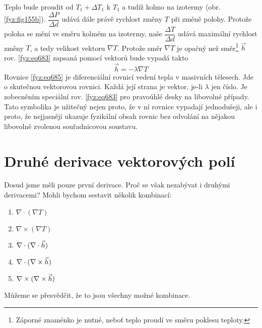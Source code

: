     Teplo bude proudit od $T_1+\Delta T_1$ k $T_1$ a tudíž kolmo na izotermy (obr.
    \ref{fyz:fig155b}). $\dfrac{\Delta P}{\Delta d}$ udává dále právě rychlost změny $T$ při změně
    polohy. Protože poloha se mění ve směru kolmém na izotermy, naše $\dfrac{\Delta T}{\Delta d}$
    udává maximální rychlost změny $T$, a tedy velikost vektoru $\nabla T$. Protože směr $\nabla T$
    je opačný než směr\footnote{Záporné znaménko je nutné, neboť teplo proudí ve směru poklesu
    teploty.} $\vec{h}$  rov. \ref{fyz:eq683} zapsaná pomocí vektorů bude vypadá takto
    \begin{equation}\label{fyz:eq685}
      \vec{h}=-\lambda\nabla T
    \end{equation}
    Rovnice \ref{fyz:eq685} je diferenciální rovnicí vedení tepla v masivních 
    tělesech. Jde o skutečnou vektorovou rovnici. Každá její strana je vektor, je-li $\lambda$ jen 
    číslo. Je zobecněním speciální rov. \ref{fyz:eq683} pro pravoúhlé desky na 
    libovolné případy. Tato symbolika je užitečný nejen proto, že v ní rovnice vypadají 
    jednodušeji, ale i proto, že nejjasněji ukazuje fyzikální obsah rovnic bez odvolání na nějakou 
    libovolně zvolenou souřadnicovou soustavu.      
    
  \section{Druhé derivace vektorových polí}\label{sec:fey_diff_2deriv}
    Dosud jsme měli pouze první derivace. Proč se však nezabývat i druhými derivacemi? Mohli bychom
    sestavit několik kombinací:
    \begin{enumerate}[leftmargin=2cm,rightmargin=2cm, label=\emph{\alph*}),noitemsep]
      \setlength{\itemsep}{0cm}%
      \setlength{\parskip}{0em}%
      \item $\nabla\cdot(\nabla T)$
      \item $\nabla\times(\nabla T)$
      \item $\nabla\cdot(\nabla\cdot\vec{h})$
      \item $\nabla\cdot(\nabla\times\vec{h})$
      \item $\nabla\times(\nabla\times\vec{h})$
    \end{enumerate}
    Můžeme se přesvědčit, že to jsou všechny možné kombinace.
  
